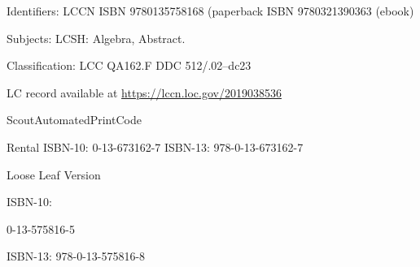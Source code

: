 \documentclass[11pt,oneside]{article}
\begin{document}
\begin{BookBody}
\noindent Identifiers: LCCN  ISBN 9780135758168 (paperback\BookInline{)\; |} ISBN 9780321390363 (ebook)

\noindent Subjects: LCSH: Algebra, Abstract.

\noindent Classification: LCC QA162.F DDC 512/.02–dc23

\noindent LC record available at \url{https://lccn.loc.gov/2019038536}

\noindent ScoutAutomatedPrintCode

Rental ISBN-10: 0-13-673162-7 ISBN-13: 978-0-13-673162-7

Loose Leaf Version

ISBN-10:

0-13-575816-5

ISBN-13: 978-0-13-575816-8

\end{BookBody}
\end{document}
